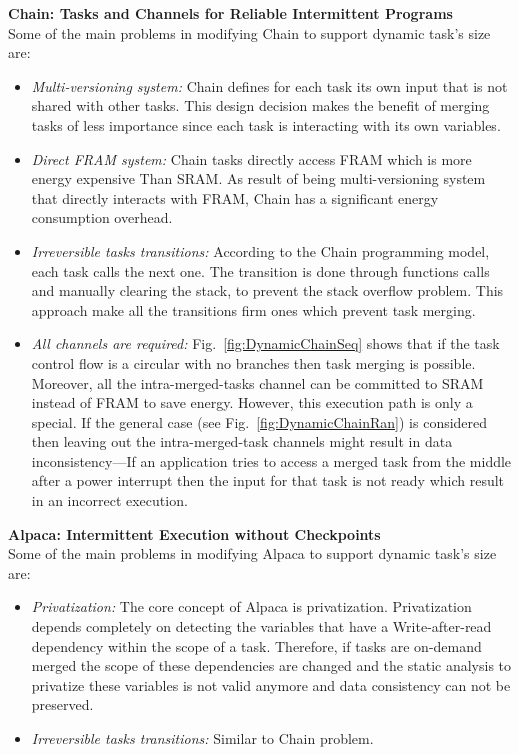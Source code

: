 \documentclass[pageno]{jpaper}
\begin{document}
\noindent\textbf{Chain: Tasks and Channels for Reliable Intermittent Programs } \\
Some of the main problems in modifying Chain to support dynamic task's size are:

\begin{itemize}
	\item \emph{Multi-versioning system:} Chain defines for each task its own input that is not shared with other tasks. This design decision makes the benefit of merging tasks of less importance since each task is interacting with its own variables. 
	\item \emph{Direct FRAM system:} Chain tasks directly access FRAM which is more energy expensive Than SRAM. As result of being multi-versioning system that directly interacts with FRAM, Chain has a significant energy consumption overhead. 
	\item \emph{Irreversible tasks transitions:} According to the Chain programming model, each task calls the next one. The transition is done through functions calls and manually clearing the stack, to prevent the stack overflow problem. This approach make all the transitions firm ones which prevent task merging.
	\item \emph{All channels are required:} Fig.~\ref{fig:DynamicChainSeq} shows that if the task control flow is a circular with no branches then task merging is possible. Moreover, all the intra-merged-tasks channel can be committed to SRAM instead of FRAM to save energy. However, this execution path is only a special. If the general case (see Fig.~\ref{fig:DynamicChainRan}) is considered then leaving out the intra-merged-task channels might result in data inconsistency---If an application tries to access a merged task from the middle after a power interrupt then the input for that task is not ready which result in an incorrect execution. 


\end{itemize}


\noindent\textbf{Alpaca: Intermittent Execution without Checkpoints} \\
Some of the main problems in modifying Alpaca to support dynamic task's size are:

\begin{itemize}
	\item \emph{Privatization:} The core concept of Alpaca is privatization. Privatization depends completely on detecting the variables that have a Write-after-read dependency within the scope of a task. Therefore, if tasks are on-demand merged the scope of these dependencies are changed and the static analysis to privatize these variables is not valid anymore and data consistency can not be preserved.  

	\item \emph{Irreversible tasks transitions:} Similar to Chain problem. 

\end{itemize}
\end{document}
